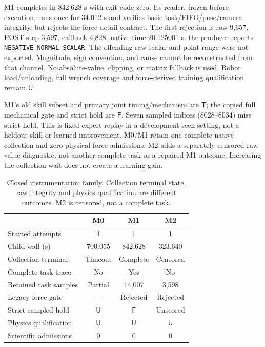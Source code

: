 \documentclass{article}
\newcommand{\True}{\ensuremath{\mathsf{T}}}
\newcommand{\False}{\ensuremath{\mathsf{F}}}
\newcommand{\Unk}{\ensuremath{\mathsf{U}}}
\begin{document}
M1 completes in 842.628 s with exit code zero. Its reader, frozen before execution, runs once for 34.012 s and verifies basic task/FIFO/pose/camera integrity, but rejects the force-detail contract. The first rejection is row 9,657, POST step 3,597, callback 4,828, native time 20.125001 s: the producer reports \texttt{NEGATIVE\_NORMAL\_SCALAR}. The offending raw scalar and point range were not exported. Magnitude, sign convention, and cause cannot be reconstructed from that channel. No absolute-value, clipping, or matrix fallback is used. Robot load/unloading, full wrench coverage and force-derived training qualification remain \Unk.

M1's old skill subset and primary joint timing/mechanism are \True; the copied full mechanical gate and strict hold are \False. Seven sampled indices (8028--8034) miss strict hold. This is fixed expert replay in a development-seen setting, not a heldout skill or learned improvement. M0/M1 retain one complete native collection and zero physical-force admissions. M2 adds a separately censored raw-value diagnostic, not another complete task or a repaired M1 outcome. Increasing the collection wait does not create a learning gain.

\begin{table}[t]
\caption{Closed instrumentation family. Collection terminal state, raw integrity and physics qualification are different outcomes. M2 is censored, not a complete task.}
\label{tab:native}\centering\footnotesize\setlength{\tabcolsep}{3pt}
\begin{tabular}{@{}lccc@{}}\toprule
 & M0 & M1 & M2\\\midrule
Started attempts &1&1&1\\
Child wall (s)&700.055&842.628&323.640\\
Collection terminal&Timeout&Complete&Censored\\
Complete task trace&No&Yes&No\\
Retained task samples&Partial&14,007&3,598\\
Legacy force gate&--&Rejected&Rejected\\
Strict sampled hold&\Unk&\False&Unscored\\
Physics qualification&\Unk&\Unk&\Unk\\
Scientific admissions&0&0&0\\\bottomrule
\end{tabular}
\end{table}
\end{document}
